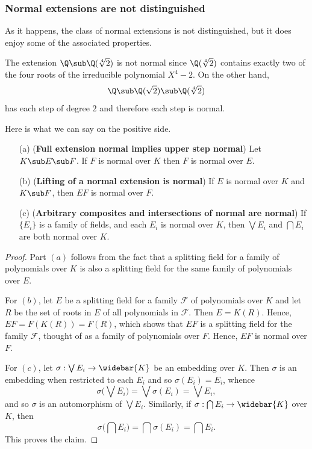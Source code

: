 \subsubsection{Normal extensions are not distinguished}
As it happens, the class of normal extensions is not distinguished, but it does enjoy some of the associated properties.
\begin{example}
The extension $\Q\sub\Q(\sqrt[4]{2})$ is not normal since $\Q(\sqrt[4]{2})$ contains exactly two of the four roots of the irreducible polynomial $X^4-2$. On the other hand,
\[\Q\sub\Q(\sqrt{2})\sub\Q(\sqrt[4]{2})\]
has each step of degree $2$ and therefore each step is normal.
\end{example}
Here is what we can say on the positive side.
\begin{proposition}\label{field normal ext prop}
\mbox{}
\begin{itemize}
\item[(a)] (\textbf{Full extension normal implies upper step normal}) Let $K\sub E\sub F$. If $F$ is normal over $K$ then $F$ is normal over $E$.
\item[(b)] (\textbf{Lifting of a normal extension is normal}) If $E$ is normal over $K$ and $K\sub F$, then $EF$ is normal over $F$.
\item[(c)] (\textbf{Arbitrary composites and intersections of normal are normal}) If $\{E_i\}$ is a family of fields, and each $E_i$ is normal over $K$, then $\bigvee E_i$ and $\bigcap E_i$ are both normal over $K$.
\end{itemize}
\end{proposition}
\begin{proof}
Part $(a)$ follows from the fact that a splitting field for a family of polynomials over $K$ is also a splitting field for the same family of polynomials over $E$.\par
For $(b)$, let $E$ be a splitting field for a family $\mathcal{F}$ of polynomials over $K$ and let $R$ be the set of roots in $E$ of all polynomials in $\mathcal{F}$. Then $E=K(R)$. Hence, $EF=F(K(R))=F(R)$, which shows that $EF$ is a splitting field for the family $\mathcal{F}$, thought of as a family of polynomials over $F$. Hence, $EF$ is normal over $F$.\par
For $(c)$, let $\sigma:\bigvee E_i\to\widebar{K}$ be an embedding over $K$. Then $\sigma$ is an embedding when restricted to each $E_i$ and so $\sigma(E_i)=E_i$, whence
\[\sigma\Big(\bigvee E_i\Big)=\bigvee\sigma(E_i)=\bigvee E_i,\]
and so $\sigma$ is an automorphism of $\bigvee E_i$. Similarly, if $\sigma:\bigcap E_i\to\widebar{K}$ over $K$, then
\[\sigma\Big(\bigcap E_i)=\bigcap\sigma(E_i)=\bigcap E_i.\]
This proves the claim.
\end{proof}
